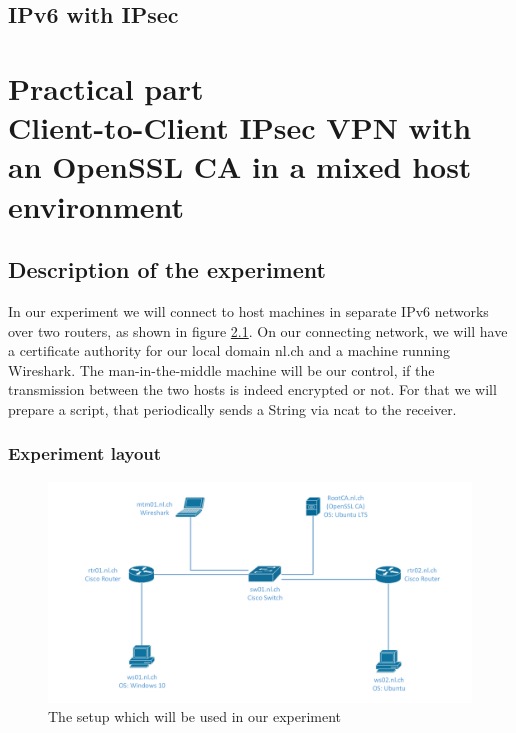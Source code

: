 \documentclass[a4paper]{report}
\begin{document}
\section{IPv6 with IPsec}
\label{sec:IPv6IPsec}

\chapter[Practical part\\Client-to-Client IPsec VPN with an OpenSSL CA in a mixed host environment]{Practical part\\\large{Client-to-Client IPsec VPN with an OpenSSL CA in a mixed host environment}}
\label{ch:Practical}

\section{Description of the experiment}
\label{sec:ExpDesc}

In our experiment we will connect to host machines in separate IPv6 networks over two routers, as shown in figure \ref{fig:exp_layout}. On our connecting network, we will have a certificate authority for our local domain nl.ch and a machine running Wireshark. The man-in-the-middle machine will be our control, if the transmission between the two hosts is indeed encrypted or not. For that we will prepare a script, that periodically sends a String via ncat to the receiver.

\subsection{Experiment layout}
\label{ssec:ExpLayout}

\begin{figure}[htb]
	\includegraphics[keepaspectratio, width = \linewidth]{experiment_layout}
	\caption{The setup which will be used in our experiment}
	\label{fig:exp_layout}
\end{figure}
\end{document}
